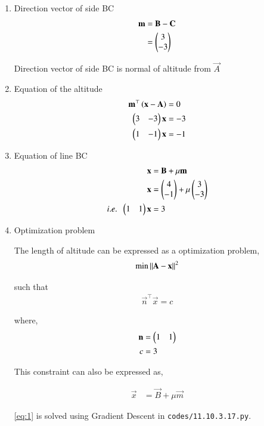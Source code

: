 \documentclass[journal,12pt,twocolumn]{IEEEtran}
\begin{document}
\begin{enumerate}

\item Direction vector of side BC
	\begin{align}
		\mathbf{m} &= \mathbf{B} - \mathbf{C} \\
		&= \begin{pmatrix}3 \\ -3\end{pmatrix} 
	\end{align}

 Direction vector of side BC is normal of altitude from $\vec{A}$

\item Equation of the altitude
	\begin{align}
		\mathbf{m}^{\top} \left(\mathbf{x} - \mathbf{A}\right) &= 0 \\
		\begin{pmatrix}3 & -3\end{pmatrix} \mathbf{x} &=  -3 \\
		\begin{pmatrix}1 & -1\end{pmatrix} \mathbf{x} &=  -1
	\end{align}

\item Equation of line BC
	\begin{align}
		\mathbf{x} &= \mathbf{B} + \mu \mathbf{m}  \\
		\mathbf{x} &= \begin{pmatrix}4 \\ -1\end{pmatrix} + \mu \begin{pmatrix}3 \\ -3\end{pmatrix} \\
		i.e. \; \; \begin{pmatrix}1 & 1\end{pmatrix} \mathbf{x} &=  3
	\end{align}

\item Optimization problem

	The length of altitude can be expressed as a optimization problem,
		\begin{align}
			\text{min} \left\lVert\mathbf{A} - \mathbf{x}\right\rVert^2  \label{eq:1}
		\end{align}

		such that 
		\begin{align}
			\vec{n}^{\top}\vec{x} = c
		\end{align}

		where,
		\begin{align}
			\mathbf{n} &=\begin{pmatrix}1 & 1\end{pmatrix} \\
			c &= 3
		\end{align}

		This constraint can also be expressed as,

		\begin{align}
			\vec{x} &= \vec{B} + \mu \vec{m} 
		\end{align}

		\eqref{eq:1} is solved using Gradient Descent in \texttt{codes/11.10.3.17.py}. 


\end{enumerate}
\end{document}
